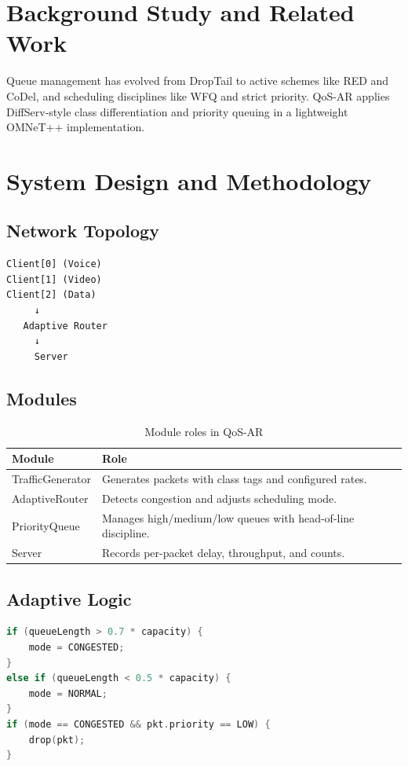 \documentclass[12pt]{article}
\begin{document}
\section{Background Study and Related Work}
Queue management has evolved from DropTail to active schemes like RED and CoDel, and scheduling disciplines like WFQ and strict priority. QoS-AR applies DiffServ-style class differentiation and priority queuing in a lightweight OMNeT++ implementation.

\section{System Design and Methodology}
\subsection{Network Topology}
\begin{verbatim}
Client[0] (Voice)
Client[1] (Video)
Client[2] (Data)
     ↓
   Adaptive Router
     ↓
     Server
\end{verbatim}

\subsection{Modules}
\begin{table}[H]
  \centering
  \caption{Module roles in QoS-AR}
  \begin{tabular}{@{}ll@{}}
    \toprule
    \textbf{Module} & \textbf{Role} \\
    \midrule
    TrafficGenerator & Generates packets with class tags and configured rates. \\
    AdaptiveRouter   & Detects congestion and adjusts scheduling mode. \\
    PriorityQueue    & Manages high/medium/low queues with head-of-line discipline. \\
    Server           & Records per-packet delay, throughput, and counts. \\
    \bottomrule
  \end{tabular}
\end{table}

\subsection{Adaptive Logic}
\begin{lstlisting}[language=C++,caption={Congestion thresholds and selective drop policy}]
if (queueLength > 0.7 * capacity) {
    mode = CONGESTED;
}
else if (queueLength < 0.5 * capacity) {
    mode = NORMAL;
}
if (mode == CONGESTED && pkt.priority == LOW) {
    drop(pkt);
}
\end{lstlisting}
\end{document}
